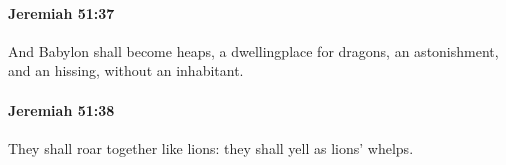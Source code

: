 		\paragraph{Jeremiah 51:37} %
			\label{JEREMIAH-51-37}

			And Babylon shall become heaps, a dwellingplace for dragons, an astonishment, and an hissing, without an inhabitant.


		\paragraph{Jeremiah 51:38} %
			\label{JEREMIAH-51-38}

			They shall roar together like lions: they shall yell as lions’ whelps.


